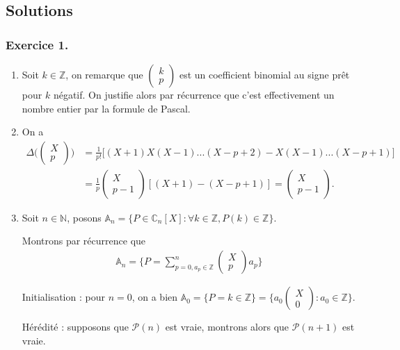 \documentclass{article}
\begin{document}
\subsection*{Solutions} 
\subsubsection*{Exercice 1.}
\begin{enumerate}
\item Soit $k\in\mathbb{Z}$, on remarque que $\begin{pmatrix}k\\p \end{pmatrix}$ est un coefficient binomial au signe prêt pour $k$ négatif. On justifie alors par récurrence que c'est effectivement un nombre entier par la formule de Pascal.
\item On a 
\begin{align*}
\Delta\bigg(\begin{pmatrix}X\\p\end{pmatrix}\bigg) &= \frac{1}{p!}\bigg[(X+1)X(X-1)...(X-p+2)-X(X-1)...(X-p+1)\bigg]\\
&= \frac{1}{p}\begin{pmatrix}X\\p-1\end{pmatrix}[(X+1)-(X-p+1)] = \begin{pmatrix}X\\p-1\end{pmatrix}.
\end{align*}

\item Soit $n\in\mathbb{N}$, posons $\mathbb{A}_n = \{P\in\mathbb{C}_n[X] : \forall k\in\mathbb{Z},P(k)\in\mathbb{Z}\}$. 

Montrons par récurrence que 
\begin{align*}
\mathbb{A}_n =\bigg\{P = \sum_{p=0, a_p\in\mathbb{Z}}^{n}\begin{pmatrix}X\\p\end{pmatrix}a_p\bigg\} 
\end{align*}

Initialisation : pour $n=0$, on a bien $\mathbb{A}_0 = \{P = k\in\mathbb{Z}\} = \{a_0 \begin{pmatrix}X\\0\end{pmatrix} : a_0\in\mathbb{Z}\}$.

Hérédité : supposons que $\mathcal{P}(n)$ est vraie, montrons alors que $\mathcal{P}(n+1)$ est vraie. 


\end{enumerate}
\end{document}

